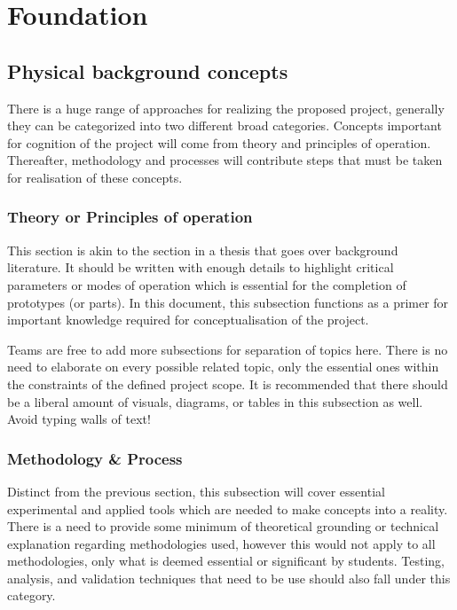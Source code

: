\documentclass{report}
\begin{document}


\chapter{Foundation}

 	\section{Physical background concepts }
         There is a huge range of approaches for realizing the proposed project, generally they can be categorized into two different broad categories. Concepts important for cognition of the project will come from theory and principles of operation. Thereafter, methodology and processes will contribute steps that must be taken for realisation of these concepts.
    
        \subsection{Theory or Principles of operation }
        This section is akin to the section in a thesis that goes over background literature. It should be written with enough details to highlight critical parameters or modes of operation which is essential for the completion of prototypes (or parts). In this document, this subsection functions as a primer for important knowledge required for conceptualisation of the project.
        \newline

        \noindent
        Teams are free to add more subsections for separation of topics here. There is no need to elaborate on every possible related topic, only the essential ones within the constraints of the defined project scope. It is recommended that there should be a liberal amount of visuals, diagrams, or tables in this subsection as well. Avoid typing walls of text!


        \subsection{Methodology \& Process}
        Distinct from the previous section, this subsection will cover essential experimental and applied tools which are needed to make concepts into a reality. There is a need to provide some minimum of theoretical grounding or technical explanation regarding methodologies used, however this would not apply to all methodologies, only what is deemed essential or significant by students. Testing, analysis, and validation techniques that need to be use should also fall under this category. 
        \newline
\end{document}
